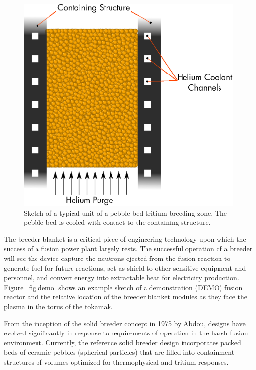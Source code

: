 \begin{figure}[ht]
	\centering
	\includegraphics[width=\singleimagewidth]{chapters/figures/solid_breeder_sketch} 
	\caption{Sketch of a typical unit of a pebble bed tritium breeding zone. The pebble bed is cooled with contact to the containing structure.}
	\label{fig:solid-breeder-sketch}
\end{figure}

The breeder blanket is a critical piece of engineering technology upon which the success of a fusion power plant largely rests. The successful operation of a breeder will see the device capture the neutrons ejected from the fusion reaction to generate fuel for future reactions, act as shield to other sensitive equipment and personnel, and convert energy into extractable heat for electricity production. Figure~\ref{fig:demo} shows an example sketch of a demonstration (DEMO) fusion reactor and the relative location of the breeder blanket modules as they face the plasma in the torus of the tokamak. 

From the inception of the solid breeder concept in 1975 by Abdou\etal\cite{Abdou1975c}, designs have evolved significantly in response to requirements of operation in the harsh fusion environment. Currently, the reference solid breeder design incorporates packed beds of ceramic pebbles (spherical particles) that are filled into containment structures of volumes optimized for thermophysical and tritium responses. 

